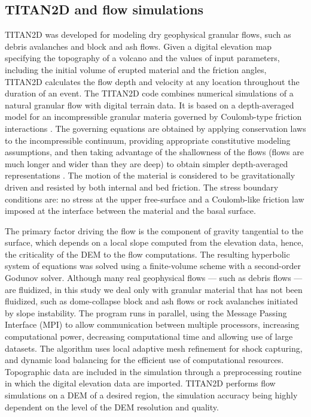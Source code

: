\documentclass[12pt]{article}
\begin{document}
\subsection{TITAN2D and flow simulations}

TITAN2D was developed for modeling dry geophysical granular flows,
such as debris avalanches and block and ash flows.  Given a digital
elevation map specifying the topography of a volcano and the values of
input parameters, including the initial volume of erupted material and
the friction angles, TITAN2D calculates the flow depth and velocity at
any location throughout the duration of an event.  The TITAN2D code
combines numerical simulations of a natural granular flow with digital
terrain data. It is based on a depth-averaged model for an
incompressible granular materia governed by Coulomb-type friction
interactions \citep{Savage1989}.  The governing equations are obtained
by applying conservation laws to the incompressible continuum,
providing appropriate constitutive modeling assumptions, and then
taking advantage of the shallowness of the flows (flows are much
longer and wider than they are deep) to obtain simpler depth-averaged
representations \citep{Patra2005}. The motion of the material is
considered to be gravitationally driven and resisted by both internal
and bed friction. The stress boundary conditions are: no stress at the
upper free-surface and a Coulomb-like friction law imposed at the
interface between the material and the basal surface.

The primary factor driving the flow is the component of gravity
tangential to the surface, which depends on a local slope computed
from the elevation data, hence, the criticality of the DEM to the flow
computations. The resulting hyperbolic system of equations was solved
using a finite-volume scheme with a second-order Godunov
solver. Although many real geophysical flows --- such as debris flows
--- are fluidized, in this study we deal only with granular material
that has not been fluidized, such as dome-collapse block and ash flows
or rock avalanches initiated by slope instability.  The program runs
in parallel, using the Message Passing Interface (MPI) to allow
communication between multiple processors, increasing computational
power, decreasing computational time and allowing use of large
datasets. The algorithm uses local adaptive mesh refinement for shock
capturing, and dynamic load balancing for the efficient use of
computational resources. Topographic data are included in the
simulation through a preprocessing routine in which the digital
elevation data are imported.  TITAN2D performs flow simulations on a
DEM of a desired region, the simulation accuracy being highly
dependent on the level of the DEM resolution and quality.
\end{document}
